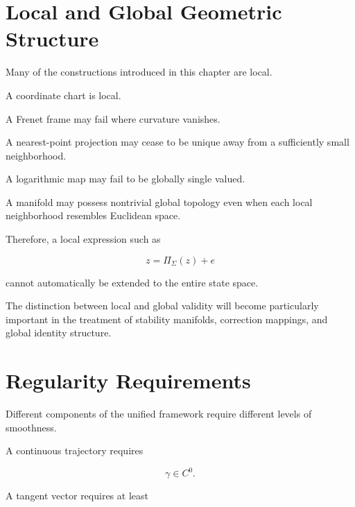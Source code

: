 \documentclass[12pt,oneside]{book}
\begin{document}

\section{Local and Global Geometric Structure}
\label{sec:local-global-geometry}

Many of the constructions introduced in this chapter are local.

A coordinate chart is local.

A Frenet frame may fail where curvature vanishes.

A nearest-point projection may cease to be unique away from a
sufficiently small neighborhood.

A logarithmic map may fail to be globally single valued.

A manifold may possess nontrivial global topology even when each
local neighborhood resembles Euclidean space.

Therefore, a local expression such as

\begin{equation}
    z
    =
    \Pi_{\Sigma}(z)
    +
    e
\end{equation}

cannot automatically be extended to the entire state space.

The distinction between local and global validity will become
particularly important in the treatment of stability manifolds,
correction mappings, and global identity structure.


\section{Regularity Requirements}
\label{sec:geometric-regularity}

Different components of the unified framework require different
levels of smoothness.

A continuous trajectory requires

\begin{equation}
    \gamma
    \in
    C^0.
\end{equation}

A tangent vector requires at least
\end{document}
